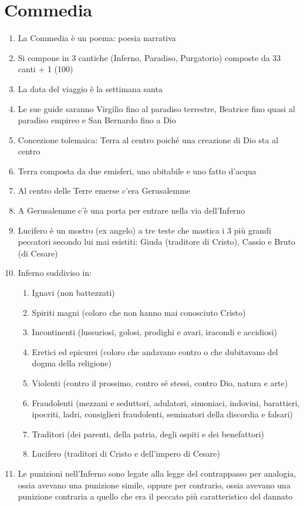 \documentclass{article}
\begin{document}
\section{Commedia}
\begin{enumerate}
    \item La Commedia è un poema: poesia narrativa
    \item Si compone in 3 cantiche (Inferno, Paradiso, Purgatorio) composte da 33 canti + 1 (100)
    \item La data del viaggio è la settimana santa
    \item Le sue guide saranno Virgilio fino al paradiso terrestre, Beatrice fino quasi al
        paradiso empireo e San Bernardo fino a Dio
    \item Concezione tolemaica: Terra al centro poiché una creazione di Dio sta al centro
    \item Terra composta da due emisferi, uno abitabile e uno fatto d'acqua
    \item Al centro delle Terre emerse c'era Gerusalemme
    \item A Gerusalemme c'è una porta per entrare nella via dell'Inferno
    \item Lucifero è un mostro (ex angelo) a tre teste che mastica i 3 più grandi peccatori
        secondo lui mai esistiti: Giuda (traditore di Cristo), Cassio e Bruto (di Cesare)
    \item Inferno suddiviso in:
        \begin{enumerate}
            \item Ignavi (non battezzati)
            \item Spiriti magni (coloro che non hanno mai conosciuto Cristo)
            \item Incontinenti (lussuriosi, golosi, prodighi e avari, iracondi e accidiosi)
            \item Eretici ed epicurei (coloro che andavano contro o che dubitavano del dogma
                della religione)
            \item Violenti (contro il prossimo, contro sé stessi, contro Dio, natura e arte)
            \item Fraudolenti (mezzani e seduttori, adulatori, simoniaci, indovini, barattieri,
                ipocriti, ladri, consiglieri fraudolenti, seminatori della discordia e falsari)
            \item Traditori (dei parenti, della patria, degli ospiti e dei benefattori)
            \item Lucifero (traditori di Cristo e dell'impero di Cesare)
        \end{enumerate}
    \item Le punizioni nell'Inferno sono legate alla legge del contrappasso per analogia,
        ossia avevano una punizione simile, oppure per contrario, ossia avevano una punizione
        contraria a quello che era il peccato più caratteristico del dannato
\end{enumerate}
\end{document}
